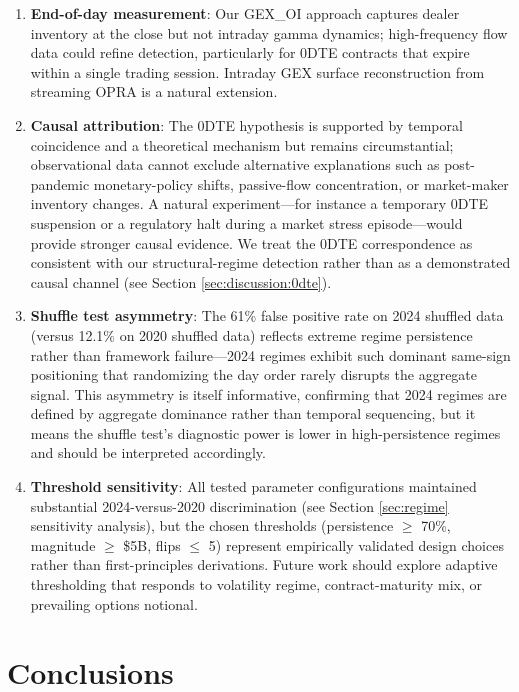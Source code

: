 \documentclass[jrfm,article,accept,moreauthors,pdftex]{Definitions/mdpi}
\begin{document}
\begin{enumerate}[leftmargin=*,labelsep=4.5mm]
\item \textbf{End-of-day measurement}: Our GEX\_OI approach captures
dealer inventory at the close but not intraday gamma dynamics; high-frequency
flow data could refine detection, particularly for 0DTE contracts that
expire within a single trading session. Intraday GEX surface reconstruction
from streaming OPRA is a natural extension.

\item \textbf{Causal attribution}: The 0DTE hypothesis is supported by
temporal coincidence and a theoretical mechanism but remains
circumstantial; observational data cannot exclude alternative explanations
such as post-pandemic monetary-policy shifts, passive-flow concentration,
or market-maker inventory changes. A natural experiment---for instance a
temporary 0DTE suspension or a regulatory halt during a market stress
episode---would provide stronger causal evidence. We treat the 0DTE
correspondence as consistent with our structural-regime detection rather
than as a demonstrated causal channel (see {Section} \ref{sec:discussion:0dte}).

\item \textbf{Shuffle test asymmetry}: The 61\% false positive rate on
2024 shuffled data (versus 12.1\% on 2020 shuffled data) reflects extreme
regime persistence rather than framework failure---2024 regimes exhibit
such dominant same-sign positioning that randomizing the day order rarely
disrupts the aggregate signal. This asymmetry is itself informative,
confirming that 2024 regimes are defined by aggregate dominance rather
than temporal sequencing, but it means the shuffle test's diagnostic
power is lower in high-persistence regimes and should be interpreted
accordingly.

\item \textbf{Threshold sensitivity}: All tested parameter
configurations maintained substantial 2024-versus-2020 discrimination
(see {Section} \ref{sec:regime} sensitivity analysis), but the chosen thresholds
(persistence $\geq$ 70\%, magnitude $\geq$ \$5B, flips $\leq$ 5) represent
empirically validated design choices rather than first-principles
derivations. Future work should explore adaptive thresholding that
responds to volatility regime, contract-maturity mix, or prevailing
options notional.
\end{enumerate}

\section{Conclusions}
\label{sec:conclusion}
\end{document}
